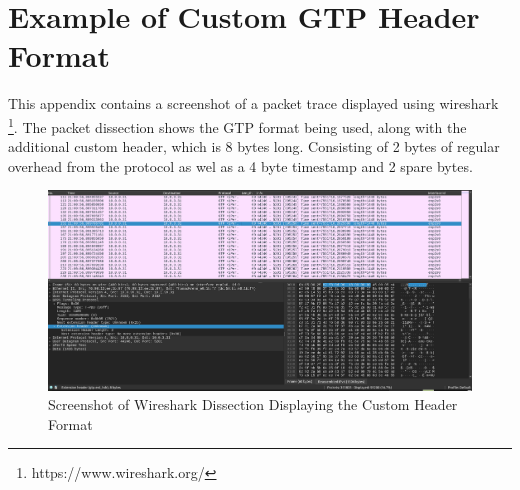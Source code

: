 
\cleardoublepage
\chapter{Example of Custom GTP Header Format}
\label{cha:qagent_example}

This appendix contains a screenshot of a packet trace displayed using wireshark \footnote{https://www.wireshark.org/}. The packet dissection shows the GTP format being used, along with the additional custom header, which is 8 bytes long. Consisting of 2 bytes of regular overhead from the protocol as wel as a 4 byte timestamp and 2 spare bytes.

\begin{figure}[ht]
    \centering
	\includegraphics[width=\textwidth]{fig/gtp_packet.png}
	\caption{Screenshot of Wireshark Dissection Displaying the Custom Header Format}
	\label{fig:wshark}
\end{figure} 

